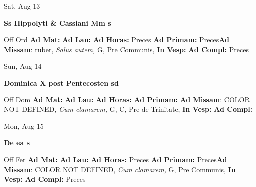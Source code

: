 \documentclass[10pt]{book}
\begin{document}
\begin{center}
\begin{minipage}{3.5in}
\vspace{2em}
\begin{center}Sat, Aug 13
\end{center}
\textbf{ \large Ss Hippolyti \& Cassiani Mm
\textnormal{\normalsize s}}

\begin{justify}Off Ord
\textbf{Ad Mat: }
\textbf{Ad Lau: }
\textbf{Ad Horas: }Preces
\textbf{Ad Primam: }Preces\textbf{Ad Missam}: ruber, \textit{Salus autem,} G, Pre Communis, 
\textbf{In Vesp: }
\textbf{Ad Compl: }Preces
\end{justify}
\end{minipage}
\end{center}

\begin{center}
\begin{minipage}{3.5in}
\vspace{2em}
\begin{center}Sun, Aug 14
\end{center}
\textbf{ \large Dominica X post Pentecosten
\textnormal{\normalsize sd}}

\begin{justify}Off Dom
\textbf{Ad Mat: }
\textbf{Ad Lau: }
\textbf{Ad Horas: }
\textbf{Ad Primam: }\textbf{Ad Missam}: COLOR NOT DEFINED, \textit{Cum clamarem,} G, C, Pre de Trinitate, 
\textbf{In Vesp: }
\textbf{Ad Compl: }
\end{justify}
\end{minipage}
\end{center}

\begin{center}
\begin{minipage}{3.5in}
\vspace{2em}
\begin{center}Mon, Aug 15
\end{center}
\textbf{ \large De ea
\textnormal{\normalsize s}}

\begin{justify}Off Fer
\textbf{Ad Mat: }
\textbf{Ad Lau: }
\textbf{Ad Horas: }Preces
\textbf{Ad Primam: }Preces\textbf{Ad Missam}: COLOR NOT DEFINED, \textit{Cum clamarem,} G, Pre Communis, 
\textbf{In Vesp: }
\textbf{Ad Compl: }Preces
\end{justify}
\end{minipage}
\end{center}
\end{document}
